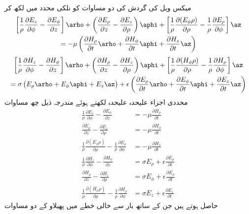 میکس ویل کی  گردش کی دو مساوات  کو نلکی محدد میں لکھ کر
\begin{multline*}
\left[\frac{1}{\rho}\frac{\partial E_z}{\partial \phi} -\frac{\partial E_{\phi}}{\partial z}\right]\arho+\left(\frac{\partial E_\rho}{\partial z}-\frac{\partial E_z}{\partial \rho} \right)\aphi+\left[\frac{1}{\rho}\frac{\partial (E_{\phi}\rho )}{\partial \rho}-\frac{1}{\rho}\frac{\partial E_{\rho}}{\partial \phi}\right]\az \\
=-\mu \left(\frac{\partial H_{\rho}}{\partial t} \arho+\frac{\partial H_{\phi}}{\partial t}\aphi+\frac{\partial H_{z}}{\partial t} \az \right)
\end{multline*}
%
\begin{multline*}
\left[\frac{1}{\rho}\frac{\partial H_z}{\partial \phi} -\frac{\partial H_{\phi}}{\partial z}\right]\arho+\left(\frac{\partial H_\rho}{\partial z}-\frac{\partial H_z}{\partial \rho} \right)\aphi+\left[\frac{1}{\rho}\frac{\partial (H_{\phi}\rho )}{\partial \rho}-\frac{1}{\rho}\frac{\partial H_{\rho}}{\partial \phi}\right]\az \\
=\sigma\left(E_{\rho}\arho+E_{\phi}\aphi+E_z \az \right)+\epsilon \left(\frac{\partial E_{\rho}}{\partial t}\arho+\frac{\partial E_{\phi}}{\partial t} \aphi+\frac{\partial E_{z}}{\partial t} \az\right)
\end{multline*} 
محددی اجزاء علیحدہ علیحدہ لکھتے ہوئے مندرجہ ذیل چھ مساوات
\begin{align}
\frac{1}{\rho}\frac{\partial E_z}{\partial \phi} -\frac{\partial E_{\phi}}{\partial z}&=-\mu \frac{\partial H_{\rho}}{\partial t} \label{مساوات_مویج_نلکی_الف}\\
\frac{\partial E_\rho}{\partial z}-\frac{\partial E_z}{\partial \rho}&=-\mu\frac{\partial H_{\phi}}{\partial t}\\
\frac{1}{\rho}\frac{\partial (E_{\phi}\rho )}{\partial \rho}-\frac{1}{\rho}\frac{\partial E_{\rho}}{\partial \phi} &=-\mu \frac{\partial H_{z}}{\partial t}\\
\frac{1}{\rho}\frac{\partial H_z}{\partial \phi} -\frac{\partial H_{\phi}}{\partial z}&=\sigma E_{\rho}+\epsilon \frac{\partial E_{\rho}}{\partial t}\\
\frac{\partial H_\rho}{\partial z}-\frac{\partial H_z}{\partial \rho}&=\sigma E_{\phi}+\epsilon \frac{\partial E_{\phi}}{\partial t} \\
\frac{1}{\rho}\frac{\partial (H_{\phi}\rho )}{\partial \rho}-\frac{1}{\rho}\frac{\partial H_{\rho}}{\partial \phi}&=\sigma E_z +\epsilon\frac{\partial E_{z}}{\partial t} 
\end{align}
حاصل ہوتے ہیں جن کے ساتھ بار سے خالی  خطے میں پھیلاو کے دو مساوات

